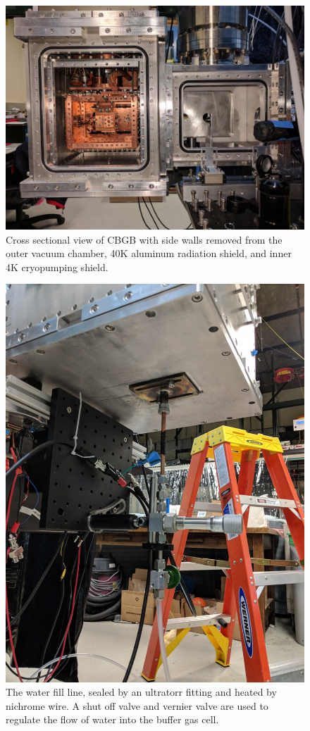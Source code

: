 \documentclass[a4paper]{article}
\begin{document}
\begin{figure}[H]
\centering
\includegraphics[width=1\textwidth]{beam_cross_section.jpg}
\caption{Cross sectional view of CBGB with side walls removed from the outer vacuum chamber, 40K aluminum radiation shield, and inner 4K cryopumping shield.}
\label{f: chamber}
\end{figure}

\begin{figure}[H]
\centering
\includegraphics[width=.7\textwidth]{water_fill_outside.jpg}
\caption{The water fill line, sealed by an ultratorr fitting and heated by nichrome wire. A shut off valve and vernier valve are used to regulate the flow of water into the buffer gas cell.}
\label{f: outside}
\end{figure}
\end{document}
